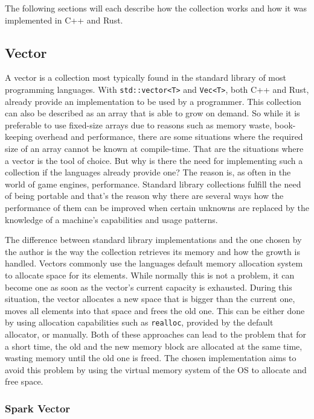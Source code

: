 The following sections will each describe how the collection works and how it was implemented in C++ and Rust.

\subsection{Vector}

A vector is a collection most typically found in the standard library of most programming languages. With \texttt{std::vector<T>} and \texttt{Vec<T>}, both C++ and Rust, already provide an implementation to be used by a programmer. This collection can also be described as an array that is able to grow on demand. So while it is preferable to use fixed-size arrays due to reasons such as memory waste, book-keeping overhead and performance, there are some situations where the required size of an array cannot be known at compile-time. That are the situations where a vector is the tool of choice. But why is there the need for implementing such a collection if the languages already provide one? The reason is, as often in the world of game engines, performance. Standard library collections fulfill the need of being portable and that's the reason why there are several ways how the performance of them can be improved when certain unknowns are replaced by the knowledge of a machine's capabilities and usage patterns. 

The difference between standard library implementations and the one chosen by the author is the way the collection retrieves its memory and how the growth is handled. Vectors commonly use the languages default memory allocation system to allocate space for its elements. While normally this is not a problem, it can become one as soon as the vector's current capacity is exhausted. During this situation, the vector allocates a new space that is bigger than the current one, moves all elements into that space and frees the old one. This can be either done by using allocation capabilities such as \texttt{realloc}, provided by the default allocator, or manually. Both of these approaches can lead to the problem that for a short time, the old and the new memory block are allocated at the same time, wasting memory until the old one is freed. The chosen implementation aims to avoid this problem by using the virtual memory system of the \ac{OS} to allocate and free space.

\subsubsection{Spark Vector}

